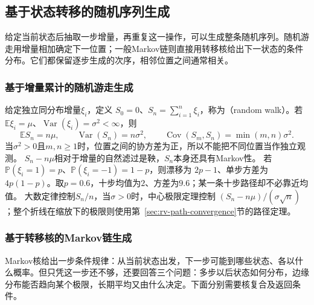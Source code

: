 \subsection{基于状态转移的随机序列生成}
\label{sec:rv-state-generation}

给定当前状态后抽取一步增量，再重复这一操作，可以生成整条随机序列。随机游走用增量相加确定下一位置；一般Markov链则直接用转移核给出下一状态的条件分布。它们都保留逐步生成的次序，相邻位置之间通常相关。

\subsubsection{基于增量累计的随机游走生成}
\label{sec:rv-random-walk}
给定独立同分布增量\(\xi_i\)，定义
\(S_0=0\)、\(S_n=\sum_{i=1}^n\xi_i\)，称为（random walk）。若
\(\mathbb E\xi_i=\mu\)、\(\operatorname{Var}(\xi_i)=\sigma^2<\infty\)，则
\[
\mathbb ES_n=n\mu,\qquad
\operatorname{Var}(S_n)=n\sigma^2,\qquad
\operatorname{Cov}(S_m,S_n)=\min(m,n)\sigma^2.
\]
当\(\sigma^2>0\)且\(m,n\geq1\)时，位置之间的协方差为正，所以不能把不同位置当作独立观测。
\(S_n-n\mu\)相对于增量的自然滤过是鞅，\(S_n\)本身还具有Markov性。
若\(\mathbb P(\xi_i=1)=p\)、\(\mathbb P(\xi_i=-1)=1-p\)，则漂移为
\(2p-1\)、单步方差为\(4p(1-p)\)。取\(p=0.6\)，十步均值为\(2\)、方差为\(9.6\)；某一条十步路径却不必靠近均值。
大数定律控制\(S_n/n\)，当\(\sigma>0\)时，中心极限定理控制
\((S_n-n\mu)/(\sigma\sqrt n)\)；整个折线在缩放下的极限则使用第~\ref{sec:rv-path-convergence}节的路径定理。

\subsubsection{基于转移核的Markov链生成}
Markov核给出一步条件规律：从当前状态出发，下一步可能到哪些状态、各以什么概率。但只凭这一步还不够，还要回答三个问题：多步以后状态如何分布，边缘分布能否趋向某个极限，长期平均又由什么决定。下面分别需要核复合及返回条件。

